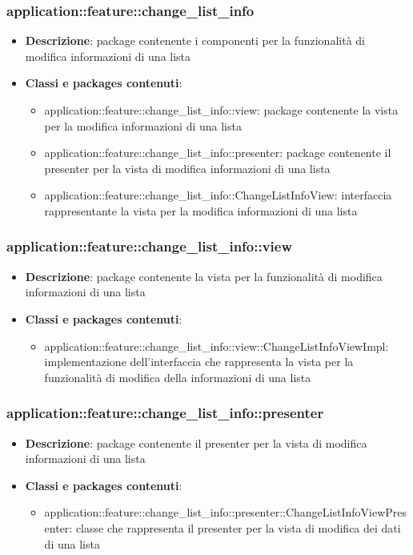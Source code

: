\subsubsection{application::feature::change\_list\_info}
\begin{itemize}
	\item \textbf{Descrizione}: package contenente i componenti per la funzionalità di modifica informazioni di una lista
	\item \textbf{Classi e packages contenuti}:
	\begin{itemize}
	\item application::feature::change\_list\_info::view: package contenente la vista per la modifica informazioni di una lista
	\item application::feature::change\_list\_info::presenter: package contenente il presenter per la vista di modifica informazioni di una lista
	\item application::feature::change\_list\_info::ChangeListInfoView: interfaccia rappresentante la vista per la modifica informazioni di una lista
	\end{itemize}
\end{itemize}

\subsubsection{application::feature::change\_list\_info::view}
\begin{itemize}
	\item \textbf{Descrizione}: package contenente la vista per la funzionalità di modifica informazioni di una lista
	\item \textbf{Classi e packages contenuti}:
	\begin{itemize}
	\item application::feature::change\_list\_info::view::ChangeListInfoViewImpl: implementazione dell'interfaccia che rappresenta la vista per la funzionalità di modifica della informazioni di una lista
	\end{itemize}
\end{itemize}

\subsubsection{application::feature::change\_list\_info::presenter}
\begin{itemize}
	\item \textbf{Descrizione}: package contenente il presenter per la vista di modifica informazioni di una lista
	\item \textbf{Classi e packages contenuti}:
	\begin{itemize}
	\item application::feature::change\_list\_info::presenter::ChangeListInfoViewPresenter: classe che rappresenta il presenter per la vista di modifica dei dati di una lista
	\end{itemize}
\end{itemize}



